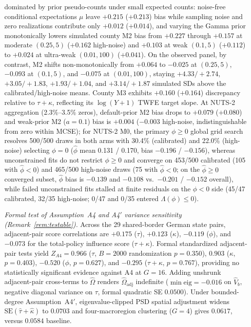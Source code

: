 dominated by prior pseudo-counts under small expected counts: noise-free conditional expectations
$\mu$ leave $+0.215$ ($+0.213$) bias while sampling noise and zero realizations contribute only
$+0.012$ ($+0.014$), and varying the Gamma prior monotonically lowers simulated county M2 bias from
$+0.227$ through $+0.157$ at moderate $(0.25,5)$ ($+0.162$ high-noise) and $+0.103$ at weak $(0.1,5)$
($+0.112$) to $+0.024$ at ultra-weak $(0.01,100)$ ($+0.041$). On the observed panel, by contrast, M2
shifts non-monotonically from $+0.064$ to $-0.025$ at $(0.25,5)$, $-0.093$ at $(0.1,5)$, and
$-0.075$ at $(0.01,100)$, staying $+4.33/+2.74$, $+3.05/+1.83$, $+1.93/+1.04$, and $+3.14/+1.87$
simulated SDs above the calibrated/high-noise means. County M3 exhibits $+0.160$ ($+0.164$)
discrepancy relative to $\tau+\kappa$, reflecting its $\log(Y+1)$ TWFE target slope. At NUTS-2
aggregation (2.3\%--3.5\% zeros), default-prior M2 bias drops to $+0.079$ ($+0.080$) and weak-prior
M2 ($a=0.1$) bias is $+0.004$ ($-0.003$ high-noise, indistinguishable from zero within MCSE);
for NUTS-2 M0, the primary $\phi\ge 0$ global grid search resolves 500/500 draws in both arms with
30.4\% (calibrated) and 22.0\% (high-noise) selecting $\phi=0$ ($\hat\phi$ mean 0.131 / 0.170, bias
$-0.196$ / $-0.156$), whereas unconstrained fits do not restrict $\phi\ge 0$ and converge on 453/500
calibrated (105 with $\hat\phi<0$) and 465/500 high-noise draws (75 with $\hat\phi<0$; on the
$\hat\phi\ge 0$ converged subset, $\hat\phi$ bias is $-0.139$ and $-0.108$ vs.\ $-0.201$ / $-0.152$
overall), while failed unconstrained fits stalled at finite residuals on the $\phi<0$ side (45/47
calibrated, 32/35 high-noise; 0/47 and 0/35 entered $\Lambda(\phi)\le 0$).

\emph{Formal test of Assumption~A4 and A4$'$ variance sensitivity (Remark~\ref{rem:testable}).}
Across the 29 shared-border German state pairs, adjacent-pair score correlations are $+0.175$
($\tau$), $+0.123$ ($\kappa$), $-0.119$ ($\phi$), and $-0.073$ for the total-policy influence score
($\tau+\kappa$). Formal standardized adjacent-pair tests yield $Z_{A4}=0.966$ ($\tau$,
$B=2000$ randomization $p=0.350$), $0.903$ ($\kappa$, $p=0.403$), $-0.520$ ($\phi$, $p=0.627$),
and $-0.295$ ($\tau+\kappa$, $p=0.767$), providing no statistically significant evidence against A4 at
$G=16$. Adding unshrunk adjacent-pair cross-terms to $\hat\Omega$ renders $\hat\Omega_{\mathrm{adj}}$
indefinite ($\min\mathrm{eig}=-0.016$ on $\hat V_b$, negative diagonal variance on $\tau$, formal
quadratic SE $0.0500$). Under bounded-degree Assumption~A4$'$, eigenvalue-clipped PSD spatial
adjustment widens $\mathrm{SE}(\hat\tau+\hat\kappa)$ to $0.0703$ and four-macroregion clustering
($G=4$) gives $0.0617$, versus $0.0584$ baseline.


